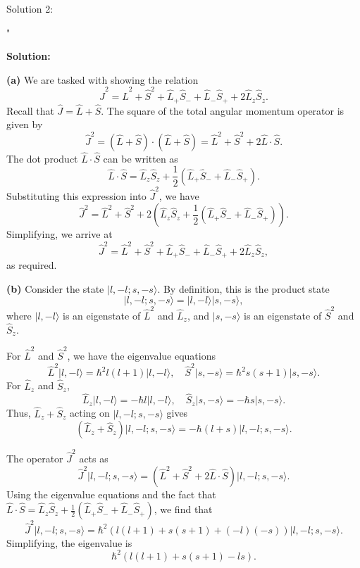 Solution 2: 

"

\textbf{Solution:}  

\textbf{(a)}  
We are tasked with showing the relation  
\[
\hat{J}^2 = \hat{L}^2 + \hat{S}^2 + \hat{L}_+ \hat{S}_- + \hat{L}_- \hat{S}_+ + 2 \hat{L}_z \hat{S}_z.
\]  
Recall that $\hat{J} = \hat{L} + \hat{S}$. The square of the total angular momentum operator is given by  
\[
\hat{J}^2 = (\hat{L} + \hat{S}) \cdot (\hat{L} + \hat{S}) = \hat{L}^2 + \hat{S}^2 + 2 \hat{L} \cdot \hat{S}.
\]  
The dot product $\hat{L} \cdot \hat{S}$ can be written as  
\[
\hat{L} \cdot \hat{S} = \hat{L}_z \hat{S}_z + \frac{1}{2}(\hat{L}_+ \hat{S}_- + \hat{L}_- \hat{S}_+).
\]  
Substituting this expression into $\hat{J}^2$, we have  
\[
\hat{J}^2 = \hat{L}^2 + \hat{S}^2 + 2 \left( \hat{L}_z \hat{S}_z + \frac{1}{2} (\hat{L}_+ \hat{S}_- + \hat{L}_- \hat{S}_+) \right).
\]  
Simplifying, we arrive at  
\[
\hat{J}^2 = \hat{L}^2 + \hat{S}^2 + \hat{L}_+ \hat{S}_- + \hat{L}_- \hat{S}_+ + 2 \hat{L}_z \hat{S}_z,
\]  
as required.  

\textbf{(b)}  
Consider the state $\lvert l, -l; s, -s \rangle$. By definition, this is the product state  
\[
\lvert l, -l; s, -s \rangle = \lvert l, -l \rangle \lvert s, -s \rangle,
\]  
where $\lvert l, -l \rangle$ is an eigenstate of $\hat{L}^2$ and $\hat{L}_z$, and $\lvert s, -s \rangle$ is an eigenstate of $\hat{S}^2$ and $\hat{S}_z$.  

For $\hat{L}^2$ and $\hat{S}^2$, we have the eigenvalue equations  
\[
\hat{L}^2 \lvert l, -l \rangle = \hbar^2 l(l+1) \lvert l, -l \rangle, \quad \hat{S}^2 \lvert s, -s \rangle = \hbar^2 s(s+1) \lvert s, -s \rangle.
\]  
For $\hat{L}_z$ and $\hat{S}_z$,  
\[
\hat{L}_z \lvert l, -l \rangle = -\hbar l \lvert l, -l \rangle, \quad \hat{S}_z \lvert s, -s \rangle = -\hbar s \lvert s, -s \rangle.
\]  
Thus, $\hat{L}_z + \hat{S}_z$ acting on $\lvert l, -l; s, -s \rangle$ gives  
\[
(\hat{L}_z + \hat{S}_z) \lvert l, -l; s, -s \rangle = -\hbar (l + s) \lvert l, -l; s, -s \rangle.
\]  

The operator $\hat{J}^2$ acts as  
\[
\hat{J}^2 \lvert l, -l; s, -s \rangle = (\hat{L}^2 + \hat{S}^2 + 2 \hat{L} \cdot \hat{S}) \lvert l, -l; s, -s \rangle.
\]  
Using the eigenvalue equations and the fact that $\hat{L} \cdot \hat{S} = \hat{L}_z \hat{S}_z + \frac{1}{2} (\hat{L}_+ \hat{S}_- + \hat{L}_- \hat{S}_+)$, we find that  
\[
\hat{J}^2 \lvert l, -l; s, -s \rangle = \hbar^2 \left( l(l+1) + s(s+1) + (-l)(-s) \right) \lvert l, -l; s, -s \rangle.
\]  
Simplifying, the eigenvalue is  
\[
\hbar^2 \left( l(l+1) + s(s+1) - ls \right).
\]  

